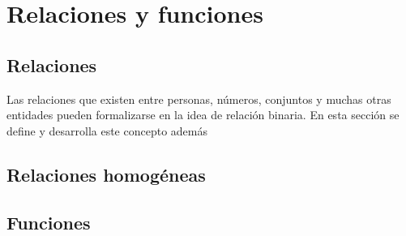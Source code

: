 \chapter{Relaciones y funciones}

\section{Relaciones}

Las relaciones que existen entre personas, números, conjuntos y muchas otras
entidades pueden formalizarse en la idea de relación binaria. En esta sección
se define y desarrolla este concepto además


\section{Relaciones homogéneas}


\section{Funciones}


